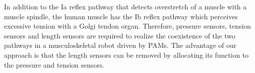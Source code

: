 In addition to the Ia reflex pathway that detects overstretch of a muscle with a muscle spindle, the human muscle has the Ib reflex pathway which perceives excessive tension with a Golgi tendon organ. Therefore, pressure sensors, tension sensors and length sensors are required to realize the coexistence of the two pathways in a musculoskeletal robot driven by PAMs. The advantage of our approach is that the length sensors can be removed by allocating its function to the pressure and tension sensors.